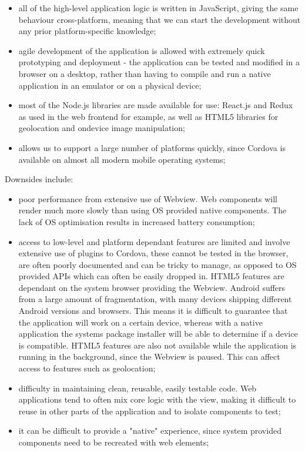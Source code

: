 \begin{itemize}
	\item all of the high-level application logic is written in JavaScript, giving the same behaviour cross-platform, meaning that we can start the development without any prior platform-specific knowledge;
	\item agile development of the application is allowed with extremely quick prototyping and deployment  - the application can be tested and modified in a browser on a desktop, rather than having to compile and run a native application in an emulator or on a physical device;
	\item most of the Node.js libraries are made available for use: React.js and Redux as used in the web frontend for example, as well as HTML5 libraries for geolocation and ondevice image manipulation;
	\item allows us to support a large number of platforms quickly, since Cordova is available on almost all modern mobile operating systems;
\end{itemize}

Downsides include:

\begin{itemize}
	\item poor performance from extensive use of Webview. Web components will render much more slowly than using OS provided native components. The lack of OS optimisation results in increased battery consumption;
	\item access to low-level and platform dependant features are limited and involve extensive use of plugins to Cordova, these cannot be tested in the browser, are often poorly documented and can be tricky to manage, as opposed to OS provided APIs which can often be easily dropped in. HTML5 features are dependant on the system browser providing the Webview. Android suffers from a large amount of fragmentation, with many devices shipping different Android versions and browsers. This means it is difficult to guarantee that the application will work on a certain device, whereas with a native application the systems package installer will be able to determine if a device is compatible. HTML5 features are also not available while the application is running in the background, since the Webview is paused. This can affect access to features such as geolocation;
	\item difficulty in maintaining clean, reusable, easily testable code. Web applications tend to often mix core logic with the view, making it difficult to reuse in other parts of the application and to isolate components to test;
	\item it can be difficult to provide a "native" experience, since system provided components need to be recreated with web elements;
\end{itemize}



